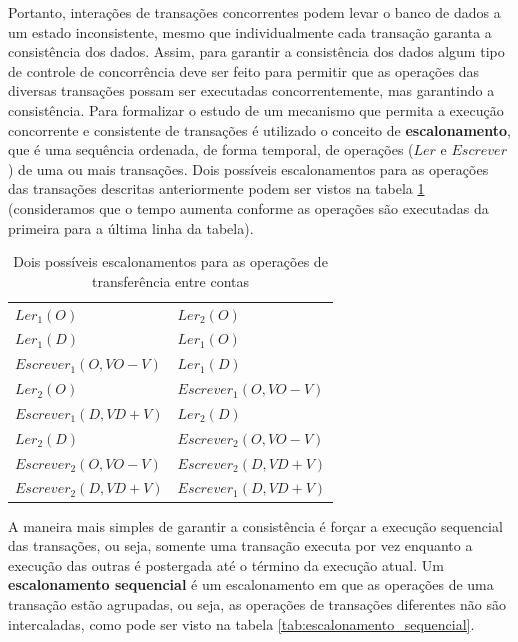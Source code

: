 \documentclass[11pt,twoside,a4paper]{book}
\begin{document}
Portanto, interações de transações concorrentes podem levar o banco de dados a um estado inconsistente, mesmo que individualmente cada transação garanta a consistência dos dados. Assim, para garantir a consistência dos dados algum tipo de controle de concorrência deve ser feito para permitir que as operações das diversas transações possam ser executadas concorrentemente, mas garantindo a consistência. Para formalizar o estudo de um mecanismo que permita a execução concorrente e consistente de transações é utilizado o conceito de \textbf{escalonamento}, que é uma sequência ordenada, de forma temporal, de operações ($Ler$ e $Escrever$) de uma ou mais transações. Dois possíveis escalonamentos para as operações das transações descritas anteriormente podem ser vistos na tabela \ref{tab:exemplo_escalonamento} (consideramos que o tempo aumenta conforme as operações são executadas da primeira para a última linha da tabela).

\begin{table}
\caption{Dois possíveis escalonamentos para as operações de transferência entre contas}
\label{tab:exemplo_escalonamento}
\centering
\begin{tabular}{ | l | l | }
	\hline
	$Ler_1(O)$&$Ler_2(O)$\\
	$Ler_1(D)$&$Ler_1(O)$\\
	$Escrever_1(O, VO - V)$&$Ler_1(D)$\\
	$Ler_2(O)$&$Escrever_1(O, VO - V)$\\
	$Escrever_1(D, VD + V)$&$Ler_2(D)$\\
	$Ler_2(D)$&$Escrever_2(O, VO - V)$\\
	$Escrever_2(O, VO - V)$&$Escrever_2(D, VD + V)$\\
	$Escrever_2(D, VD + V)$&$Escrever_1(D, VD + V)$\\
	\hline
\end{tabular}
\end{table}

A maneira mais simples de garantir a consistência é forçar a execução sequencial das transações, ou seja, somente uma transação executa por vez enquanto a execução das outras é postergada até o término da execução atual. Um \textbf{escalonamento sequencial} é um escalonamento em que as operações de uma transação estão agrupadas, ou seja, as operações de transações diferentes não são intercaladas, como pode ser visto na tabela \ref{tab:escalonamento_sequencial}.
\end{document}
